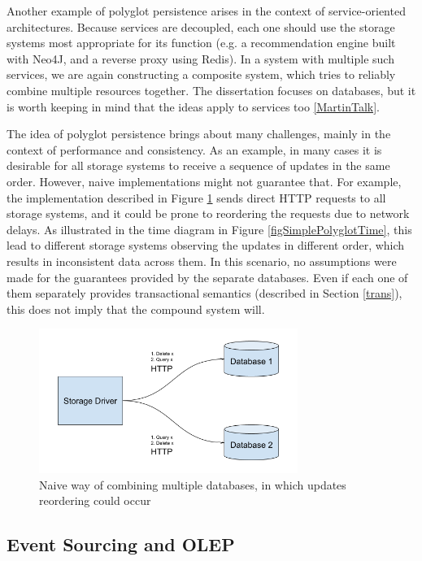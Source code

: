 \documentclass[12pt]{article}
\begin{document}
Another example of polyglot persistence arises in the context of service-oriented architectures. Because services are decoupled, each one should use the storage systems most appropriate for its function (e.g. a recommendation engine built with Neo4J, and a reverse proxy using Redis). In a system with multiple such services, we are again constructing a composite system, which tries to reliably combine multiple resources together. The dissertation focuses on databases, but it is worth keeping in mind that the ideas apply to services too \ref{MartinTalk}.

The idea of polyglot persistence brings about many challenges, mainly in the context of performance and consistency. As an example, in many cases it is desirable for all storage systems to receive a sequence of updates in the same order. However, naive implementations might not guarantee that. For example, the implementation described in Figure \ref{figSimplePolyglot} sends direct HTTP requests to all storage systems, and it could be prone to reordering the requests due to network delays. As illustrated in the time diagram in Figure \ref{figSimplePolyglotTime}, this lead to different storage systems observing the updates in different order, which results in inconsistent data across them. In this scenario, no assumptions were made for the guarantees provided by the separate databases. Even if each one of them separately provides transactional semantics (described in Section \ref{trans}), this does not imply that the compound system will.

\begin{figure}[h]
    \caption{Naive way of combining multiple databases, in which updates reordering could occur}
    \centering
    \label{figSimplePolyglot}
    \includegraphics[width=0.75\textwidth]{simple_naive_polyglot.png}
\end{figure}

\subsection{Event Sourcing and OLEP}
\end{document}
